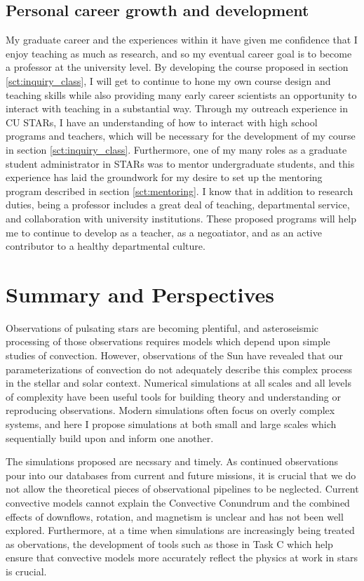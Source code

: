 \documentclass[aasms,11pt]{article}
\begin{document}
\subsection{Personal career growth and development}
\label{sct:personal_growth}
My graduate career and the experiences within it have given me confidence that I enjoy teaching as much as research, and so my eventual career goal is to become a professor at the university level.
By developing the course proposed in section \ref{sct:inquiry_class}, I will get to continue to hone my own course design and teaching skills while also providing many early career scientists an opportunity to interact with teaching in a substantial way.
Through my outreach experience in CU STARs, I have an understanding of how to interact with high school programs and teachers, which will be necessary for the development of my course in section \ref{sct:inquiry_class}.
Furthermore, one of my many roles as a graduate student administrator in STARs was to mentor undergraduate students, and this experience has laid the groundwork for my desire to set up the mentoring program described in section \ref{sct:mentoring}.
I know that in addition to research duties, being a professor includes a great deal of teaching, departmental service, and collaboration with university institutions.
These proposed programs will help me to continue to develop as a teacher, as a negoatiator, and as an active contributor to a healthy departmental culture.

\section{Summary and Perspectives}
\vspace{-6pt}
Observations of pulsating stars are becoming plentiful, and asteroseismic processing of those observations requires models which depend upon simple studies of convection.
However, observations of the Sun have revealed that our parameterizations of convection do not adequately describe this complex process in the stellar and solar context.
Numerical simulations at all scales and all levels of complexity have been useful tools for building theory and understanding or reproducing observations.
Modern simulations often focus on overly complex systems, and here I propose simulations at both small and large scales which sequentially build upon and inform one another.

The simulations proposed are necssary and timely.
As continued observations pour into our databases from current and future missions, it is crucial that we do not allow the theoretical pieces of observational pipelines to be neglected.
Current convective models cannot explain the Convective Conundrum and the combined effects of downflows, rotation, and magnetism is unclear and has not been well explored.
Furthermore, at a time when simulations are increasingly being treated as obervations, the development of tools such as those in Task C which help ensure that convective models more accurately reflect the physics at work in stars is crucial.
\end{document}
